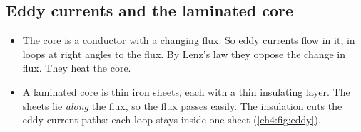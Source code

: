 \subsection{Eddy currents and the laminated core}

\begin{itemize}
  \item The core is a conductor with a changing flux. So eddy currents flow in it, in loops
        at right angles to the flux. By Lenz's law they oppose the change in flux. They heat the core.
  \item A laminated core is thin iron sheets, each with a thin insulating layer. The sheets
        lie \emph{along} the flux, so the flux passes easily. The insulation cuts the
        eddy-current paths: each loop stays inside one sheet (\cref{ch4:fig:eddy}).
\end{itemize}

